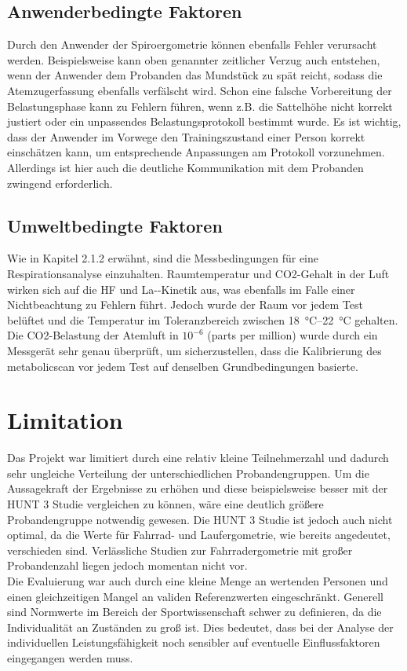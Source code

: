 \subsection{Anwenderbedingte Faktoren}
%
Durch den Anwender der Spiroergometrie können ebenfalls Fehler verursacht werden. Beispielsweise kann oben genannter zeitlicher Verzug auch entstehen, wenn der Anwender dem Probanden das Mundstück zu spät reicht, sodass die Atemzugerfassung ebenfalls verfälscht wird. Schon eine falsche Vorbereitung der Belastungsphase kann zu Fehlern führen, wenn z.B. die Sattelhöhe nicht korrekt justiert oder ein unpassendes Belastungsprotokoll bestimmt wurde. Es ist wichtig, dass der Anwender im Vorwege den Trainingszustand einer Person korrekt einschätzen kann, um entsprechende Anpassungen am Protokoll vorzunehmen. Allerdings ist hier auch die deutliche Kommunikation mit dem Probanden zwingend erforderlich.
%
\subsection{Umweltbedingte Faktoren}
%
Wie in Kapitel 2.1.2 erwähnt, sind die Messbedingungen für eine Respirationsanalyse einzuhalten. Raumtemperatur und \gls{CO2}-Gehalt in der Luft wirken sich auf die \gls{HF} und \gls{La-}-Kinetik aus, was ebenfalls im Falle einer Nichtbeachtung zu Fehlern führt. Jedoch wurde der Raum vor jedem Test belüftet und die Temperatur im Toleranzbereich zwischen \SIrange{18}{22}{\degreeCelsius} gehalten. Die \gls{CO2}-Belastung der Atemluft in $10^{-6}$ (parts per million) wurde durch ein Messgerät sehr genau überprüft, um sicherzustellen, dass die Kalibrierung des metabolicscan vor jedem Test auf denselben Grundbedingungen basierte.
%
\section{Limitation}
%
Das Projekt war limitiert durch eine relativ kleine Teilnehmerzahl und dadurch sehr ungleiche Verteilung der unterschiedlichen Probandengruppen. Um die Aussagekraft der Ergebnisse zu erhöhen und diese beispielsweise besser mit der HUNT 3 Studie vergleichen zu können, wäre eine deutlich größere Probandengruppe notwendig gewesen. Die HUNT 3 Studie ist jedoch auch nicht optimal, da die Werte für Fahrrad- und Laufergometrie, wie bereits angedeutet, verschieden sind. Verlässliche Studien zur Fahrradergometrie mit großer Probandenzahl liegen jedoch momentan nicht vor.\\
Die Evaluierung war auch durch eine kleine Menge an wertenden Personen und einen gleichzeitigen Mangel an validen Referenzwerten eingeschränkt. Generell sind Normwerte im Bereich der Sportwissenschaft schwer zu definieren, da die Individualität an Zuständen zu groß ist. Dies bedeutet, dass bei der Analyse der individuellen Leistungsfähigkeit noch sensibler auf eventuelle Einflussfaktoren eingegangen werden muss.
%
